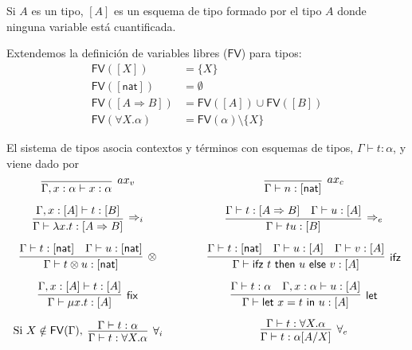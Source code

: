 \documentclass[twoside,a4paper,12pt]{article}
\theoremstyle{definition}
\theoremstyle{remark}
\newcommand\fix[2]{\ensuremath{\mathsf{\mu}#1.#2}}
\newcommand\fun[2]{\ensuremath{\lambda {#1}{.}{#2}}}
\newcommand\FV{\ensuremath{\mathsf{FV}}}
\newcommand\ifz[3]{\ensuremath{\mathsf{ifz~}#1\mathsf{~then~}#2\mathsf{~else~}#3}}
\newcommand\letl[3]{\ensuremath{\mathsf{let~}#1=#2\mathsf{~in~}#3}}
\newcommand\nat{\ensuremath{\mathsf{nat}}}
\begin{document}
Si $A$ es un tipo, $[A]$ es un esquema de tipo formado por el tipo $A$ donde
ninguna variable está cuantificada.

\begin{definicion}{6.3}
  Extendemos la definición de variables libres (\FV) para tipos:
  \begin{align*}
    \FV([X]) & = \{X\}\\
    \FV([\nat]) & = \emptyset\\
    \FV([A\Rightarrow B]) & = \FV([A])\cup\FV([B])\\
    \FV(\forall X.\alpha) & = \FV(\alpha)\setminus\{X\}
  \end{align*}
\end{definicion}

\begin{definicion}
  El sistema de tipos asocia contextos y términos con esquemas de tipos,
  $\Gamma\vdash t:\alpha$, y viene dado por
  \[
    \begin{array}{c@{\qquad\qquad}c}
      \infer[ax_v]{\Gamma,x:\alpha\vdash x:\alpha}{}
      &
        \infer[ax_c]{\Gamma\vdash n:[\nat]}{}
      \\[2ex]
      \infer[\Rightarrow_i]{\Gamma\vdash\fun xt:[A\Rightarrow B]}
      {\Gamma,x:[A]\vdash t:[B]}
      &
        \infer[\Rightarrow_e]{\Gamma\vdash tu:[B]}
        {
        \Gamma\vdash t:[A\Rightarrow B]
      &
        \Gamma\vdash u:[A]
        }
      \\[2ex]
      \infer[\otimes]{\Gamma\vdash t\otimes u:[\nat]}
      {\Gamma\vdash t:[\nat] & \Gamma\vdash u:[\nat]}
      &
        \infer[\mathsf{ifz}]{\Gamma\vdash\ifz tuv:[A]}
        {\Gamma\vdash t:[\nat] & \Gamma\vdash u:[A] & \Gamma\vdash v:[A]}
      \\[2ex]
      \infer[\mathsf{fix}]{\Gamma\vdash\fix xt:[A]}{\Gamma,x:[A]\vdash t:[A]}
      &
        \infer[\mathsf{let}]{\Gamma\vdash\letl xtu:[A]}
        {\Gamma\vdash t:\alpha & \Gamma,x:\alpha\vdash u:[A]}
      \\[2ex]
      \textrm{Si }X\notin\FV(\Gamma),\ \vcenter{\infer[\forall_i]{\Gamma\vdash t:\forall X.\alpha}{\Gamma\vdash t:\alpha}}
      &
        \vcenter{\infer[\forall_e]{\Gamma\vdash t:\alpha[A/X]}{\Gamma\vdash t:\forall X.\alpha}}
    \end{array}
  \]
\end{definicion}
\end{document}
